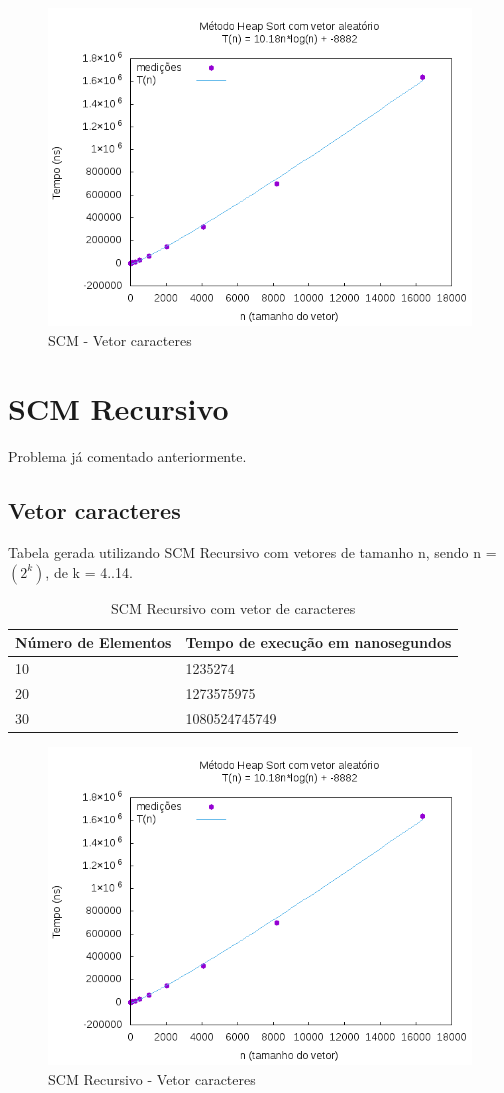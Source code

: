 \documentclass[12pt,a4paper,twoside]{report}
\begin{document}
\begin{figure}[H]
    \centering
    \includegraphics[width=0.7\linewidth]{graficos/HeapSort/vIntAleatorio/vIntAleatorio.png}
  \caption{SCM - Vetor caracteres}
\end{figure}


\section{SCM Recursivo}

Problema já comentado anteriormente.

\subsection{Vetor caracteres}
Tabela gerada utilizando SCM Recursivo com vetores de tamanho n, sendo n = $(2^k)$, de k = 4..14.
\begin{table}[H]
\centering
\caption{SCM Recursivo com vetor de caracteres}
\label{my-label}
\begin{tabular}{|l|l|}
\hline
\multicolumn{1}{|c|}{\textbf{Número de Elementos}} & \multicolumn{1}{c|}{\textbf{Tempo de execução em nanosegundos}} \\ \hline
10 & 1235274 \\ \hline
20 & 1273575975 \\ \hline
30 & 1080524745749 \\ \hline

\end{tabular}
\end{table}

\begin{figure}[H]
    \centering
    \includegraphics[width=0.7\linewidth]{graficos/HeapSort/vIntAleatorio/vIntAleatorio.png}
  \caption{SCM Recursivo - Vetor caracteres}
\end{figure}
\end{document}
